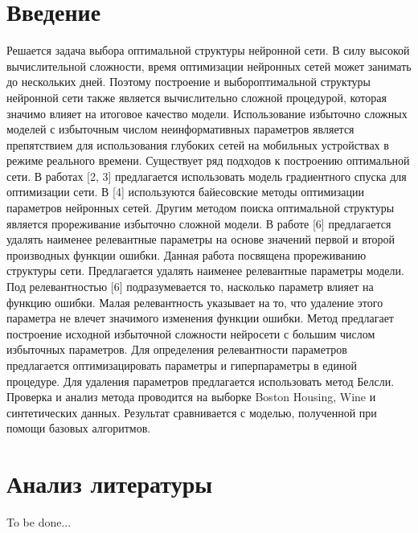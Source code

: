 \newpage


\section{Введение}
Решается задача выбора оптимальной структуры нейронной сети. В силу высокой вычислительной сложности, время оптимизации нейронных сетей может занимать до нескольких дней. Поэтому построение и выбороптимальной структуры нейронной сети также является вычислительно сложной процедурой, которая значимо влияет на итоговое качество
модели. Использование избыточно сложных моделей с избыточным числом неинформативных параметров является препятствием для использования глубоких сетей на мобильных устройствах в режиме реального времени. Существует ряд подходов к построению оптимальной сети. В работах [2, 3] предлагается использовать модель градиентного спуска для оптимизации сети. В [4] используются байесовские методы оптимизации параметров нейронных сетей. Другим методом поиска оптимальной структуры является прореживание избыточно сложной модели.
В работе [6] предлагается удалять наименее релевантные параметры на основе значений первой и второй производных функции ошибки.
Данная работа посвящена прореживанию структуры сети. Предлагается удалять наименее релевантные параметры модели. Под релевантностью [6] подразумевается то, насколько параметр влияет на функцию
ошибки. Малая релевантность указывает на то, что удаление этого параметра не влечет значимого изменения функции ошибки. Метод предлагает построение исходной избыточной сложности нейросети с большим числом избыточных параметров. Для определения релевантности параметров предлагается оптимизацировать параметры и гиперпараметры в
единой процедуре. Для удаления параметров предлагается использовать метод Белсли.
Проверка и анализ метода проводится на выборке Boston Housing, Wine и синтетических данных. Результат сравнивается с моделью, полученной при помощи базовых алгоритмов.

\section{Анализ литературы}
To be done...
